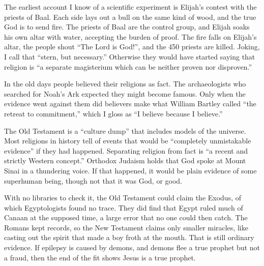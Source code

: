
The earliest account I know of a scientific experiment is Elijah's contest with the priests of Baal. Each side lays out a bull on the same kind of wood, and the true God is to send fire. The priests of Baal are the control group, and Elijah soaks his own altar with water, accepting the burden of proof. The fire falls on Elijah's altar, the people shout ``The Lord is God!'', and the 450 priests are killed. Joking, I call that ``stern, but necessary.'' Otherwise they would have started saying that religion is ``a separate magisterium which can be neither proven nor disproven.'' 

In the old days people believed their religions as fact. The archaeologists who searched for Noah's Ark expected they might become famous. Only when the evidence went against them did believers make what William Bartley called ``the retreat to commitment,'' which I gloss as ``I believe because I believe.'' 

The Old Testament is a ``culture dump'' that includes models of the universe. Most religions in history tell of events that would be ``completely unmistakable evidence'' if they had happened. Separating religion from fact is ``a recent and strictly Western concept.'' Orthodox Judaism holds that God spoke at Mount Sinai in a thundering voice. If that happened, it would be plain evidence of some superhuman being, though not that it was God, or good. 

With no libraries to check it, the Old Testament could claim the Exodus, of which Egyptologists found no trace. They did find that Egypt ruled much of Canaan at the supposed time, a large error that no one could then catch.  The Romans kept records, so the New Testament claims only smaller miracles, like casting out the spirit that made a boy froth at the mouth. That is still ordinary evidence. If epilepsy is caused by demons, and demons flee a true prophet but not a fraud, then the end of the fit shows Jesus is a true prophet. 

